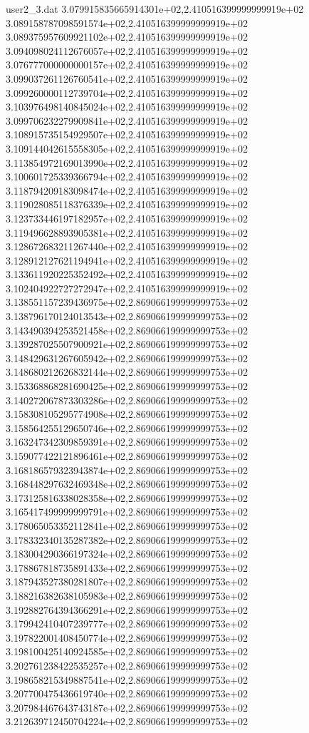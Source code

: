 \begin{filecontents}{user2_3.dat}
3.079915835665914301e+02,2.410516399999999919e+02
3.089158787098591574e+02,2.410516399999999919e+02
3.089375957609921102e+02,2.410516399999999919e+02
3.094098024112676057e+02,2.410516399999999919e+02
3.076777000000000157e+02,2.410516399999999919e+02
3.099037261126760541e+02,2.410516399999999919e+02
3.099260000112739704e+02,2.410516399999999919e+02
3.103976498140845024e+02,2.410516399999999919e+02
3.099706232279909841e+02,2.410516399999999919e+02
3.108915735154929507e+02,2.410516399999999919e+02
3.109144042615558305e+02,2.410516399999999919e+02
3.113854972169013990e+02,2.410516399999999919e+02
3.100601725339366794e+02,2.410516399999999919e+02
3.118794209183098474e+02,2.410516399999999919e+02
3.119028085118376339e+02,2.410516399999999919e+02
3.123733446197182957e+02,2.410516399999999919e+02
3.119496628893905381e+02,2.410516399999999919e+02
3.128672683211267440e+02,2.410516399999999919e+02
3.128912127621194941e+02,2.410516399999999919e+02
3.133611920225352492e+02,2.410516399999999919e+02
3.102404922727272947e+02,2.410516399999999919e+02
3.138551157239436975e+02,2.869066199999999753e+02
3.138796170124013543e+02,2.869066199999999753e+02
3.143490394253521458e+02,2.869066199999999753e+02
3.139287025507900921e+02,2.869066199999999753e+02
3.148429631267605942e+02,2.869066199999999753e+02
3.148680212626832144e+02,2.869066199999999753e+02
3.153368868281690425e+02,2.869066199999999753e+02
3.140272067873303286e+02,2.869066199999999753e+02
3.158308105295774908e+02,2.869066199999999753e+02
3.158564255129650746e+02,2.869066199999999753e+02
3.163247342309859391e+02,2.869066199999999753e+02
3.159077422121896461e+02,2.869066199999999753e+02
3.168186579323943874e+02,2.869066199999999753e+02
3.168448297632469348e+02,2.869066199999999753e+02
3.173125816338028358e+02,2.869066199999999753e+02
3.165417499999999791e+02,2.869066199999999753e+02
3.178065053352112841e+02,2.869066199999999753e+02
3.178332340135287382e+02,2.869066199999999753e+02
3.183004290366197324e+02,2.869066199999999753e+02
3.178867818735891433e+02,2.869066199999999753e+02
3.187943527380281807e+02,2.869066199999999753e+02
3.188216382638105983e+02,2.869066199999999753e+02
3.192882764394366291e+02,2.869066199999999753e+02
3.179942410407239777e+02,2.869066199999999753e+02
3.197822001408450774e+02,2.869066199999999753e+02
3.198100425140924585e+02,2.869066199999999753e+02
3.202761238422535257e+02,2.869066199999999753e+02
3.198658215349887541e+02,2.869066199999999753e+02
3.207700475436619740e+02,2.869066199999999753e+02
3.207984467643743187e+02,2.869066199999999753e+02
3.212639712450704224e+02,2.869066199999999753e+02

\end{filecontents}

